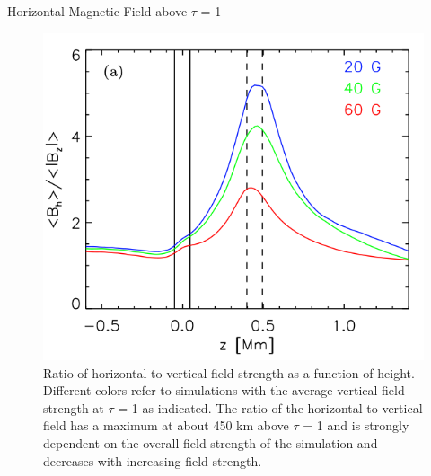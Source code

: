 \documentclass{beamer}
\begin{document}
\begin{frame}{Horizontal Magnetic Field above $\tau$ = 1 }

\begin{figure}[H]
 \centering
 \includegraphics[scale=0.3]{img381.png}
	\caption{Ratio of horizontal to vertical field strength as a function of height. Different colors refer to simulations with the average vertical field strength at $\tau$ = 1
as indicated. The ratio of the horizontal to vertical field has a maximum at about 450 km above $\tau$ = 1 and is strongly dependent on the overall field strength of the
simulation and decreases with increasing field strength. }
\end{figure}

\end{frame}
\end{document}
